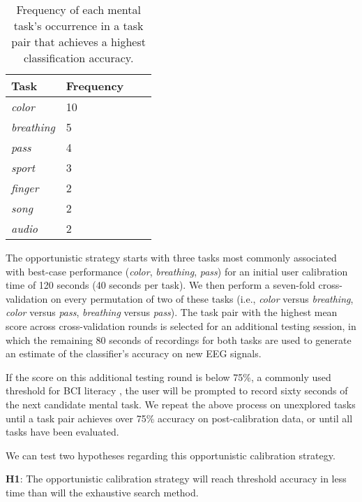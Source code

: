 \begin{table}[!h]
  \centering
  \begin{tabular}{ | l | l | l | p{5cm} |}
  \hline
  Task & Frequency \\ \hline
  \textit{color} & 10 \\ \hline
  \textit{breathing} & 5 \\ \hline
  \textit{pass} & 4 \\ \hline
  \textit{sport} & 3 \\ \hline
  \textit{finger} & 2 \\ \hline
  \textit{song} & 2 \\ \hline
  \textit{audio} & 2 \\ \hline
  \end{tabular}
  \caption{Frequency of each mental task's occurrence in a task pair that achieves a highest classification accuracy.}
  \label{table:name}
\end{table}

The opportunistic strategy starts with three tasks most commonly associated with best-case performance (\textit{color}, \textit{breathing}, \textit{pass}) for an initial user calibration time of 120 seconds (40 seconds per task). We then perform a seven-fold cross-validation on every permutation of two of these tasks (i.e., \textit{color} versus \textit{breathing}, \textit{color} versus \textit{pass}, \textit{breathing} versus \textit{pass}). The task pair with the highest mean score across cross-validation rounds is selected for an additional testing session, in which the remaining 80 seconds of recordings for both tasks are used to generate an estimate of the classifier's accuracy on new EEG signals.

If the score on this additional testing round is below 75\%, a commonly used threshold for BCI literacy \cite{vidaurre_towards_2010}, the user will be prompted to record sixty seconds of the next candidate mental task. We repeat the above process on unexplored tasks until a task pair achieves over 75\% accuracy on post-calibration data, or until all tasks have been evaluated.

We can test two hypotheses regarding this opportunistic calibration strategy.

\hfill

\textbf{H1}: The opportunistic calibration strategy will reach threshold accuracy in less time than will the exhaustive search method.


